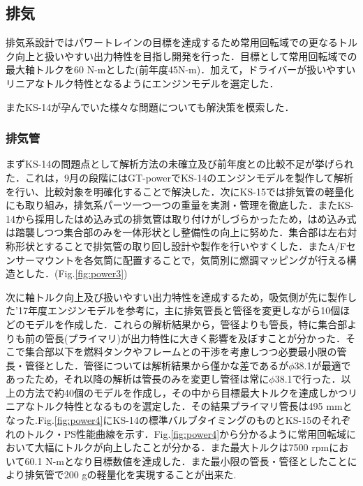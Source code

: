 \subsection{排気}
排気系設計ではパワートレインの目標を達成するため常用回転域での更なるトルク向上と扱いやすい出力特性を目指し開発を行った．目標として常用回転域での最大軸トルクを60 N-mとした(前年度45N-m)．加えて，ドライバーが扱いやすいリニアなトルク特性となるようにエンジンモデルを選定した．

またKS-14が孕んでいた様々な問題についても解決策を模索した．

\subsubsection{排気管}
まずKS-14の問題点として解析方法の未確立及び前年度との比較不足が挙げられた．これは，9月の段階にはGT-powerでKS-14のエンジンモデルを製作して解析を行い、比較対象を明確化することで解決した．次にKS-15では排気管の軽量化にも取り組み，排気系パーツ一つ一つの重量を実測・管理を徹底した．またKS-14から採用したはめ込み式の排気管は取り付けがしづらかったため，はめ込み式は踏襲しつつ集合部のみを一体形状とし整備性の向上に努めた．集合部は左右対称形状とすることで排気管の取り回し設計や製作を行いやすくした．またA/Fセンサーマウントを各気筒に配置することで，気筒別に燃調マッピングが行える構造とした．(Fig.\ref{fig:power3})

次に軸トルク向上及び扱いやすい出力特性を達成するため，吸気側が先に製作した’17年度エンジンモデルを参考に，主に排気管長と管径を変更しながら10個ほどのモデルを作成した．これらの解析結果から，管径よりも管長，特に集合部よりも前の管長(プライマリ)が出力特性に大きく影響を及ぼすことが分かった．そこで集合部以下を燃料タンクやフレームとの干渉を考慮しつつ必要最小限の管長・管径とした．管径については解析結果から僅かな差であるが$\phi$38.1が最適であったため，それ以降の解析は管長のみを変更し管径は常に$\phi$38.1で行った．以上の方法で約40個のモデルを作成し，その中から目標最大トルクを達成しかつリニアなトルク特性となるものを選定した．その結果プライマリ管長は495 mmとなった.Fig.\ref{fig:power4}にKS-14の標準バルブタイミングのものとKS-15のそれぞれのトルク・PS性能曲線を示す．Fig.\ref{fig:power4}から分かるように常用回転域において大幅にトルクが向上したことが分かる．また最大トルクは7500 rpmにおいて60.1 N-mとなり目標数値を達成した．また最小限の管長・管径としたことにより排気管で200 gの軽量化を実現することが出来た.

